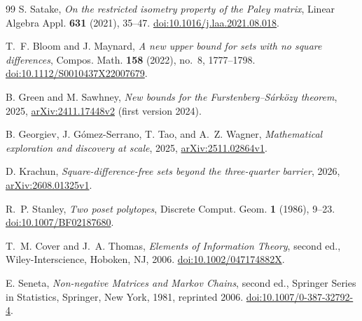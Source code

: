 \documentclass[11pt]{article}
\theoremstyle{definition}
\theoremstyle{remark}
\begin{document}
\begin{thebibliography}{99}
S. Satake,
\emph{On the restricted isometry property of the Paley matrix},
Linear Algebra Appl. \textbf{631} (2021), 35--47.
\href{https://doi.org/10.1016/j.laa.2021.08.018}{doi:10.1016/j.laa.2021.08.018}.

T.~F. Bloom and J. Maynard,
\emph{A new upper bound for sets with no square differences},
Compos. Math. \textbf{158} (2022), no.~8, 1777--1798.
\href{https://doi.org/10.1112/S0010437X22007679}{doi:10.1112/S0010437X22007679}.

B. Green and M. Sawhney,
\emph{New bounds for the Furstenberg--S\'ark\"ozy theorem},
2025, \href{https://arxiv.org/abs/2411.17448v2}{arXiv:2411.17448v2}
(first version 2024).

B. Georgiev, J. G\'omez-Serrano, T. Tao, and A.~Z. Wagner,
\emph{Mathematical exploration and discovery at scale},
2025, \href{https://arxiv.org/abs/2511.02864v1}{arXiv:2511.02864v1}.

D. Krachun,
\emph{Square-difference-free sets beyond the three-quarter barrier},
2026, \href{https://arxiv.org/abs/2608.01325v1}{arXiv:2608.01325v1}.

R.~P. Stanley,
\emph{Two poset polytopes},
Discrete Comput. Geom. \textbf{1} (1986), 9--23.
\href{https://doi.org/10.1007/BF02187680}{doi:10.1007/BF02187680}.


T.~M. Cover and J.~A. Thomas,
\emph{Elements of Information Theory}, second ed.,
Wiley-Interscience, Hoboken, NJ, 2006.
\href{https://doi.org/10.1002/047174882X}{doi:10.1002/047174882X}.


E. Seneta,
\emph{Non-negative Matrices and Markov Chains}, second ed.,
Springer Series in Statistics, Springer, New York, 1981,
reprinted 2006.
\href{https://doi.org/10.1007/0-387-32792-4}{doi:10.1007/0-387-32792-4}.



\end{thebibliography}
\end{document}
